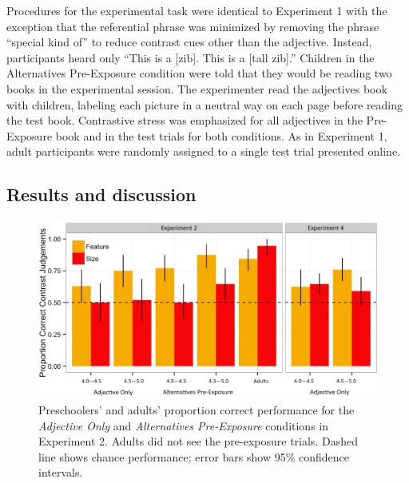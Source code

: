 \documentclass[man]{apa2}
\begin{document}
Procedures for the experimental task were identical to Experiment 1 with the exception that the referential phrase was minimized by removing the phrase ``special kind of'' to reduce contrast cues other than the adjective.  Instead, participants heard only ``This is a [zib]. This is a [tall zib].''  Children in the Alternatives Pre-Exposure condition were told that they would be reading two books in the experimental session. The experimenter read the adjectives book with children, labeling each picture in a neutral way on each page before reading the test book. Contrastive stress was emphasized for all adjectives in the Pre-Exposure book and in the test trials for both conditions. As in Experiment 1, adult participants were randomly assigned to a single test trial presented online.  

\subsection{Results and discussion}

\begin{figure}[t] 
  \begin{center} 
    \includegraphics[width=6in]{figures/expts2And4.png} 
    \caption{\label{fig:expt2_kidsAdults} Preschoolers' and adults' proportion correct performance for the \emph{Adjective Only} and \emph{Alternatives Pre-Exposure} conditions in Experiment 2. Adults did not see the pre-exposure trials. Dashed line shows chance performance; error bars show 95\% confidence intervals.}
  \end{center} 
\end{figure}
\end{document}
